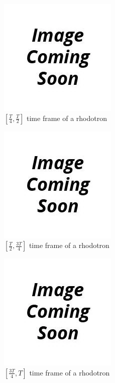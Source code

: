\documentclass{article}
\begin{document}
\begin{figure}[H]
    \centering
    \includegraphics[scale=0.75]{../../../figures/to_be_added.png}
    \caption{$[\frac{T}{4}, \frac{T}{2}]$ time frame of a rhodotron}
\end{figure}

\begin{figure}[H]
    \centering
    \includegraphics[scale=0.75]{../../../figures/to_be_added.png}
    \caption{$[\frac{T}{2}, \frac{3T}{4}]$ time frame of a rhodotron}
\end{figure}

\begin{figure}[H]
    \centering
    \includegraphics[scale=0.75]{../../../figures/to_be_added.png}
    \caption{$[\frac{3T}{4}, T]$ time frame of a rhodotron}
\end{figure}
\end{document}
